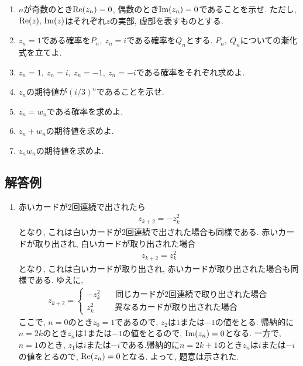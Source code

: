 \documentclass[dvipdfmx,titlepage, 11pt, a4paper]{jsarticle}%
\begin{document}
\begin{enumerate}[(1)]
	\setlength{\itemindent}{10pt}
	      \setlength{\itemsep}{10pt}
	\item $n$が奇数のとき${\rm Re}(z_{n})=0$, 偶数のとき${\rm Im}(z_{n})=0$であることを示せ. ただし, ${\rm Re}(z),\,{\rm Im}(z)$はそれぞれ$z$の実部, 虚部を表すものとする.
	\item $z_{n}=1$である確率を$P_{n},\ z_{n}=i$である確率を$Q_{n}$とする. $P_{n},\ Q_{n}$についての漸化式を立てよ.
	\item $z_{n}=1,\ z_{n}=i,\ z_{n}=-1,\ z_{n}=-i$である確率をそれぞれ求めよ.
	\item $z_{n}$の期待値が$(i/3)^{n}$であることを示せ.
	\item $z_{n}=w_{n}$である確率を求めよ.
	\item $z_{n}+w_{n}$の期待値を求めよ.
	\item $z_{n}w_{n}$の期待値を求めよ.
\end{enumerate}
\newpage

\subsection{解答例}
\begin{enumerate}[(1)]
	\setlength{\itemsep}{10pt}
	\item 赤いカードが2回連続で出されたら
	      \begin{eqnarray*}
		      z_{k+2}=-z_{k}^{2}
	      \end{eqnarray*}
	      となり, これは白いカードが2回連続で出された場合も同様である. 赤いカードが取り出され, 白いカードが取り出された場合
	      \begin{eqnarray*}
		      z_{k+2}=z_{k}^{2}
	      \end{eqnarray*}
	      となり, これは白いカードが取り出され, 赤いカードが取り出された場合も同様である. ゆえに,
	      \begin{eqnarray*}
		      z_{k+2}=\left\{
		      \begin{array}{l}
			      -z_{k}^{2}\hspace{22pt} 同じカードが2回連続で取り出された場合 \\
			      z_{k}^{2}\hspace{30pt} 異なるカードが取り出された場合
		      \end{array}
		      \right.
	      \end{eqnarray*}
	      ここで, $n=0$のとき$z_{0}=1$であるので, $z_{2}$は$1$または$-1$の値をとる. 帰納的に$n=2k$のとき$z_{n}$は1または$-1$の値をとるので, ${\rm Im}(z_{n})=0$となる. 一方で, $n=1$のとき, $z_{1}$は$i$または$-i$である.帰納的に$n=2k+1$のとき$z_{n}$は$i$または$-i$の値をとるので, ${\rm Re}(z_{n})=0$となる. よって, 題意は示された.
\end{enumerate}
\end{document}

